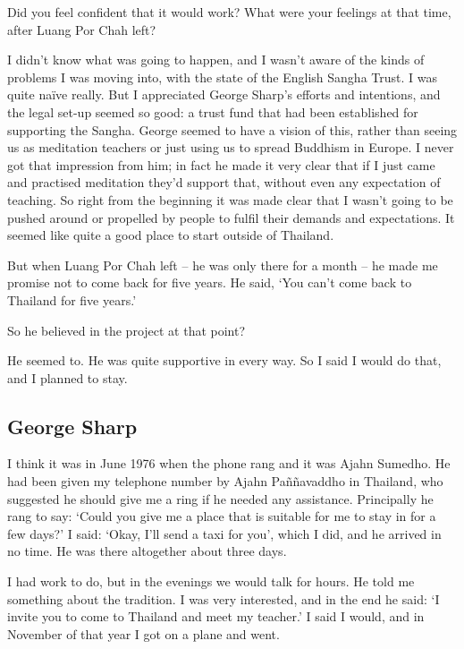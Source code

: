 \question{}
Did you feel confident that it would work? What were your
feelings at that time, after Luang Por Chah left? 

\answer{}
I didn't know what was going to happen, and I wasn't aware of the
kinds of problems I was moving into, with the state of the English
Sangha Trust. I was quite naïve really. But I appreciated George Sharp's
efforts and intentions, and the legal set-up seemed so good: a trust
fund that had been established for supporting the Sangha. George seemed
to have a vision of this, rather than seeing us as meditation teachers
or just using us to spread Buddhism in Europe. I never got that
impression from him; in fact he made it very clear that if I just came
and practised meditation they'd support that, without even any
expectation of teaching. So right from the beginning it was made clear
that I wasn't going to be pushed around or propelled by people to fulfil
their demands and expectations. It seemed like quite a good place to
start outside of Thailand.

But when Luang Por Chah left -- he was only there for a month -- he made
me promise not to come back for five years. He said, `You can't come
back to Thailand for five years.'

\question{}
So he believed in the project at that point?

\answer{}
He seemed to. He was quite supportive in every way. So I said
I would do that, and I planned to stay.

\subsection{George Sharp}

I think it was in June 1976 when the phone rang and it was Ajahn
Sumedho. He had been given my telephone number by Ajahn Paññavaddho in
Thailand, who suggested he should give me a ring if he needed any
assistance. Principally he rang to say: `Could you give me a place that
is suitable for me to stay in for a few days?' I said: `Okay, I'll send
a taxi for you', which I did, and he arrived in no time. He was there
altogether about three days.

I had work to do, but in the evenings we would talk for hours. He told
me something about the tradition. I was very interested, and in the end
he said: `I invite you to come to Thailand and meet my teacher.' I said
I would, and in November of that year I got on a plane and went. 

